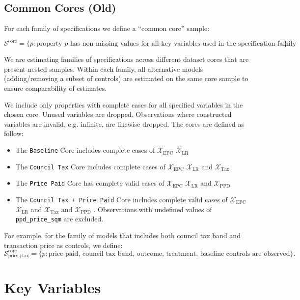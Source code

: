 \documentclass[12pt]{article}
\begin{document}
\subsection{Common Cores (Old)}
For each family of specifications  we define a ``common core'' sample:

\[
\mathcal{S}^{\text{core}} = \{ p : \text{property $p$ has non-missing values for all key variables used in the specification family} \}.
\]


We are estimating families of specifications across different dataset cores that are present nested samples. Within each family, all alternative models (adding/removing a subset of controls) are estimated on the same core sample to ensure comparability of estimates.
 
We include only properties with complete cases for all specified variables in the chosen core. Unused variables are dropped. Observations where constructed variables are invalid, e.g. infinite, are likewise dropped. The cores are defined as follow:
    \begin{itemize}
        \item The \texttt{Baseline} Core includes complete cases of $\mathcal{X}_{\text{EPC}}$  $\mathcal{X}_{\text{LR}}$
        \item The \texttt{Council Tax} Core includes complete cases of $\mathcal{X}_{\text{EPC}}$  $\mathcal{X}_{\text{LR}}$ and $\mathcal{X}_{\text{Tax}}$
        \item The \texttt{Price Paid} Core has complete valid cases of $\mathcal{X}_{\text{EPC}}$  $\mathcal{X}_{\text{LR}}$ and $\mathcal{X}_{\text{PPD}}$
        \item The \texttt{Council Tax + Price Paid} Core includes complete valid cases of $\mathcal{X}_{\text{EPC}}$  $\mathcal{X}_{\text{LR}}$ and $\mathcal{X} _{\text{Tax}}$ and $\mathcal{X}_{\text{PPD}}$ . Observations with undefined values of \texttt{ppd\_price\_sqm} are excluded. 
        \end{itemize}
For example, for the family of models that includes both council tax band and transaction price as controls, we define:
\[
\mathcal{S}^{\text{core}}_{\text{price+tax}} = \{ p : \text{price paid, council tax band, outcome, treatment, baseline controls are observed} \}.
\]

\section{Key Variables}
\end{document}
